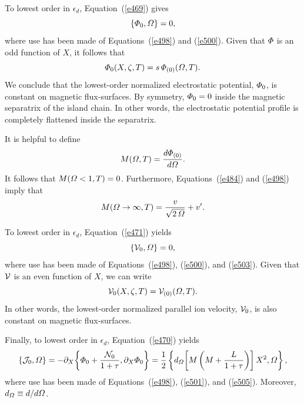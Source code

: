 \documentclass[notitlepage,12pt]{article}
\begin{document}
To lowest order in $\epsilon_d$, Equation~(\ref{e469}) gives
\begin{equation}
\{{\mit\Phi}_0,{\mit\Omega}\}=0,
\end{equation}
where use has been made of Equations~(\ref{e498}) and (\ref{e500}). Given that
${\mit\Phi}$ is an odd function of $X$, it follows that 
\begin{equation}\label{e503}
{\mit\Phi}_0(X,\zeta,T) = s\, {\mit\Phi}_{(0)}({\mit\Omega},T).
\end{equation}
 We conclude that the lowest-order normalized
electrostatic potential, ${\mit\Phi}_{0}$, is  constant on magnetic flux-surfaces. 
By symmetry, ${\mit\Phi}_{0}=0$ inside the magnetic separatrix of the island chain. In other words, the electrostatic
potential profile is  completely flattened inside the separatrix. 

It is helpful to define
\begin{equation}\label{e505}
M({\mit\Omega},T) = \frac{d{\mit\Phi}_{(0)}}{d{\mit\Omega}}.
\end{equation}
It follows that $M({\mit\Omega}<1,T)=0$. Furthermore, Equations~(\ref{e484}) and (\ref{e498}) imply that
\begin{equation}\label{e506}
M({\mit\Omega}\rightarrow\infty,T) = \frac{v}{\sqrt{2\,{\mit\Omega}}}+ v'.
\end{equation}

To lowest order in $\epsilon_d$, Equation~(\ref{e471}) yields
\begin{equation}
\{{\cal V}_0,{\mit\Omega}\} = 0,
\end{equation}
where use has been made of Equations~(\ref{e498}), (\ref{e500}), and (\ref{e503}). Given that
${\cal V}$ is an even function of $X$, we can write
\begin{equation}\label{e508}
{\cal V}_0(X,\zeta,T) = {\cal V}_{(0)}({\mit\Omega},T).
\end{equation}
In other words, the lowest-order normalized parallel ion velocity, ${\cal V}_0$, is also constant on
magnetic flux-surfaces. 

Finally, to lowest order in $\epsilon_d$, Equation~(\ref{e470}) yields
\begin{equation}\label{e509}
\{{\cal J}_0,{\mit\Omega}\} = -\partial_X\!\left\{{\mit\Phi}_0+\frac{{\cal N}_0}{1+\tau}, \partial_X {\mit\Phi}_0\right\}=
\frac{1}{2}\left\{d_{\mit\Omega}\!\left[M\left(M+\frac{L}{1+\tau}\right)\right]X^2, {\mit\Omega}\right\},
\end{equation}
where use has been made of Equations~(\ref{e498}), (\ref{e501}), and (\ref{e505}). Moreover, $d_{\mit\Omega}\equiv
d/d{\mit\Omega}$. 
\end{document}

